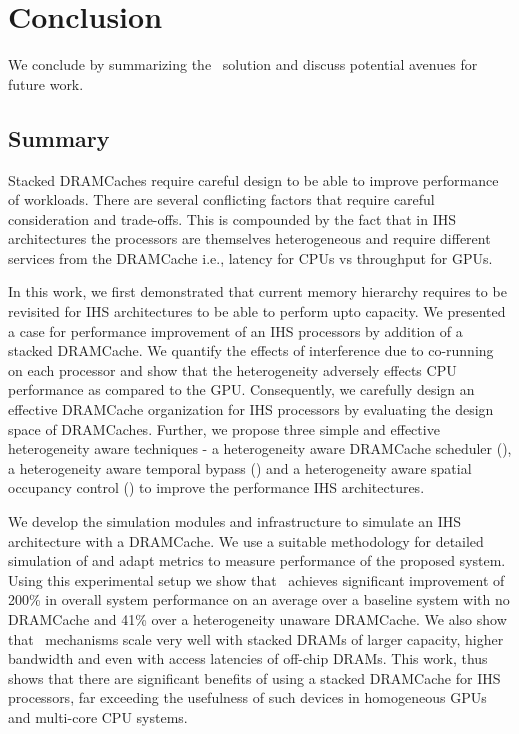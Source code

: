 \chapter{Conclusion} \label{chap:conclusion}
We conclude by summarizing the \cachename\ solution and discuss potential avenues for future work.
\section{Summary}
Stacked DRAMCaches require careful design to be able to improve performance of workloads. There are several conflicting factors that require careful consideration and trade-offs. This is compounded by the fact that in IHS architectures the processors are themselves heterogeneous and require different services from the DRAMCache i.e., latency for CPUs vs throughput for GPUs.
\par In this work, we first demonstrated that current memory hierarchy requires to be revisited for IHS architectures to be able to perform upto capacity. We presented a case for performance improvement of an IHS processors by addition of a stacked DRAMCache. 
We quantify the effects of interference due to co-running on each processor and show that the heterogeneity adversely effects CPU performance as compared to the GPU. 
Consequently, we carefully design an effective DRAMCache organization for IHS processors by evaluating the design space of DRAMCaches.
Further, we propose three simple and effective heterogeneity aware techniques - a heterogeneity aware DRAMCache scheduler (\prioname), a heterogeneity aware temporal bypass (\bypassname) and a heterogeneity aware spatial occupancy control (\chaining) to improve the performance IHS architectures.
\par We develop the simulation modules and infrastructure to simulate an IHS architecture with a DRAMCache. We use a suitable methodology for detailed simulation of \cachename and adapt metrics to measure performance of the proposed system. Using this experimental setup we show that 
\cachename\ achieves significant improvement of 200\% in overall system performance on an average over a baseline system with no DRAMCache and 41\% over a heterogeneity unaware DRAMCache. 
We also show that \cachename\ mechanisms scale very well with stacked DRAMs of larger capacity, higher bandwidth and even with access latencies of off-chip DRAMs.
This work, thus shows that there are significant benefits of using a stacked DRAMCache for IHS processors, far exceeding the usefulness of such devices in homogeneous GPUs and multi-core CPU systems.

